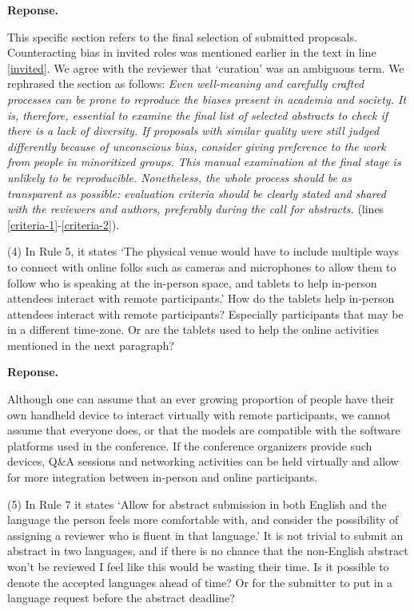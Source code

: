 \documentclass{article}
\newenvironment{Reply}{\noindent\color{BlueViolet}\textbf{Reponse.}}{\vspace{1em}}
\begin{document}
\begin{Reply}

This specific section refers to the final selection of submitted proposals. Counteracting bias in invited roles was mentioned earlier in the text in line \ref{invited}.
We agree with the reviewer that `curation' was an ambiguous term.
We rephrased the section as follows: \textit{
Even well-meaning and carefully crafted processes can be prone to reproduce the biases present in academia and society. It is, therefore, essential to examine the final list of selected abstracts to check if there is a lack of diversity. If proposals with similar quality were still judged differently because of unconscious bias, consider giving preference to the work from people in minoritized groups.
This manual examination at the final stage is unlikely to be reproducible. Nonetheless, the whole process should be as transparent as possible: evaluation criteria should be clearly stated and shared with the reviewers and authors, preferably during the call for abstracts.} (lines \ref{criteria-1}-\ref{criteria-2}).

\end{Reply}

(4) In Rule 5, it states `The physical venue would have to include multiple ways to connect with online folks such as cameras and microphones to allow them to follow who is speaking at the in-person space, and tablets to help in-person attendees interact with remote participants.' How do the tablets help in-person attendees interact with remote participants? Especially participants that may be in a different time-zone. Or are the tablets used to help the online activities mentioned in the next paragraph?

\begin{Reply}

Although one can assume that an ever growing proportion of people have their own handheld device to interact virtually with remote participants, we cannot assume that everyone does, or that the models are compatible with the software platforms used in the conference. 
If the conference organizers provide such devices, Q\&A sessions and networking activities can be held virtually and allow for more integration between in-person and online participants. 
\end{Reply}

(5) In Rule 7 it states `Allow for abstract submission in both English and the language the person feels more comfortable with, and consider the possibility of assigning a reviewer who is fluent in that language.' It is not trivial to submit an abstract in two languages, and if there is no chance that the non-English abstract won't be reviewed I feel like this would be wasting their time. Is it possible to denote the accepted languages ahead of time? Or for the submitter to put in a language request before the abstract deadline?
\end{document}
